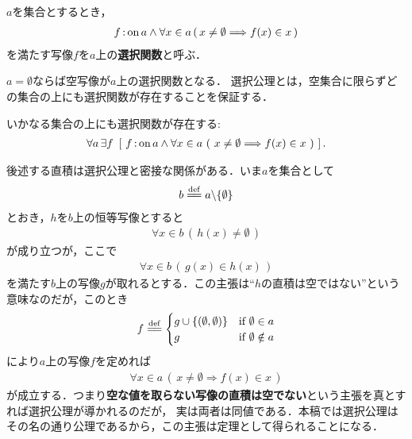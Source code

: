 	
	\begin{screen}
		\begin{dfn}[選択関数]
			$a$を集合とするとき，
			\begin{align}
				f \operatorname*{:on} a \wedge \forall x \in a\, (\, x \neq \emptyset \Longrightarrow f(x) \in x\, )
			\end{align}
			を満たす写像$f$を$a$上の{\bf 選択関数}と呼ぶ．
		\end{dfn}
	\end{screen}
	
	$a = \emptyset$ならば空写像が$a$上の選択関数となる．
	選択公理とは，空集合に限らずどの集合の上にも選択関数が存在することを保証する．
	
	\begin{screen}
		\begin{axm}[選択公理]
			いかなる集合の上にも選択関数が存在する:
			\begin{align}
				\forall a\, \exists f\ \left[\ 
				f \fon a \wedge \forall x \in a\ 
				(\ x \neq \emptyset \Longrightarrow f(x) \in x\ )\ \right]. 
			\end{align}
		\end{axm}
	\end{screen}
	
	後述する直積は選択公理と密接な関係がある．いま$a$を集合として
	\begin{align}
		b \defeq a \backslash \{\emptyset\}
	\end{align}
	とおき，$h$を$b$上の恒等写像とすると
	\begin{align}
		\forall x \in b\, (\, h(x) \neq \emptyset\, )
	\end{align}
	が成り立つが，ここで
	\begin{align}
		\forall x \in b\, (\, g(x) \in h(x)\, )
	\end{align}
	を満たす$b$上の写像$g$が取れるとする．この主張は``$h$の直積は空ではない''という意味なのだが，このとき
	\begin{align}
		f \defeq 
		\begin{cases}
			g \cup \{(\emptyset,\emptyset)\} & \mbox{if } \emptyset \in a \\
			g & \mbox{if } \emptyset \notin a
		\end{cases}
	\end{align}
	により$a$上の写像$f$を定めれば
	\begin{align}
		\forall x \in a\, (\, x \neq \emptyset \Longrightarrow f(x) \in x\, )
	\end{align}
	が成立する．つまり{\bf 空な値を取らない写像の直積は空でない}という主張を真とすれば選択公理が導かれるのだが，
	実は両者は同値である．本稿では選択公理はその名の通り公理であるから，この主張は定理として得られることになる．
	
